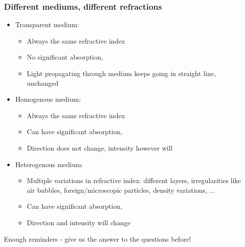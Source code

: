 \documentclass{f4_beamer_metropolis}
\begin{document}
\begin{frame}[t]
  \frametitle{Different mediums, different refractions}
  \begin{itemize}
    \item Transparent medium:
      \begin{itemize}
        \item Always the same refractive index
        \item No significant absorption,
        \item Light propagating through medium keeps going in straight line, unchanged
      \end{itemize}
    \item Homogenous medium:
      \begin{itemize}
        \item Always the same refractive index
        \item Can have significant absorption,
        \item Direction does not change, intensity however will
      \end{itemize}
    \item Heterogenous medium:
      \begin{itemize}
        \item Multiple variations in refractive index: different layers, irregularities like air bubbles, foreign/microscopic particles, density variations, ...
        \item Can have significant absorption,
        \item Direction and intensity will change
      \end{itemize}
  \end{itemize}

\end{frame}

\begin{frame}[standout]
  Enough reminders - give us the answer to the questions before!
\end{frame}
\end{document}
